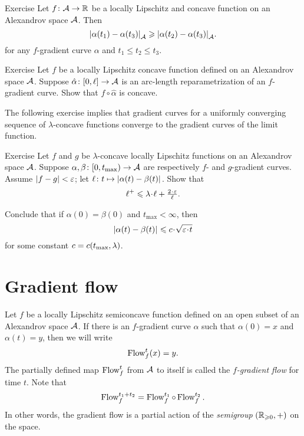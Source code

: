 \begin{thm}{Exercise}\label{ex:elf-contracting}
Let $f\colon\mathcal{A}\to\mathbb{R}$ be a locally Lipschitz and concave function on an Alexandrov space
$\mathcal{A}$.
Then 
\[|{\alpha(t_1)}-{\alpha(t_3)}|_{\mathcal{A}}^{{}}\geqslant |{\alpha(t_2)}-{\alpha(t_3)}|_{\mathcal{A}}^{{}}.\]
for any $f$-gradient curve $\alpha$ and $t_1\le t_2\le t_3$.
\end{thm}

\begin{thm}{Exercise}\label{ex:mayer}
Let $f$ be a locally Lipschitz concave function defined on an Alexandrov space $\mathcal{A}$.
Suppose $\hat\alpha\colon[0,\ell]\to\mathcal{A}$ is an arc-length reparametrization of an $f$-gradient curve.
Show that $f\circ\hat\alpha$ is concave.
\end{thm}




The following exercise implies that gradient curves for a uniformly converging sequence of $\lambda$-concave functions converge to the gradient curves of the limit function.

\begin{thm}{Exercise}\label{lem:fg-dist-est}
Let $f$ and $g$ be $\lambda$-concave locally Lipschitz functions on an Alexandrov space $\mathcal{A}$.
Suppose
$\alpha,\beta\colon[0,t_{\max})\to \mathcal{A}$ are respectively $f$- and $g$-gradient curves.
Assume $|f-g|<\varepsilon$; let $\ell\colon t\mapsto|{\alpha(t)}-{\beta(t)}|_{}^{{}}$.
Show that
\[\ell^+\le \lambda\cdot\ell+\tfrac{2\cdot\eps}{\ell}.\]

Conclude that if $\alpha(0)=\beta(0)$ and $t_{\max}<\infty$, then
\[\dist{\alpha(t)}{\beta(t)}{}
\le
\Const\cdot\sqrt{\eps\cdot t}\]
for some constant $c=c(t_{\max},\lambda)$.
\end{thm}

\section{Gradient flow}

Let $f$ be a locally Lipschitz semiconcave function defined on an open subset of an Alexandrov space $\mathcal{A}$.
If there is an $f$-gradient curve $\alpha$ such that $\alpha(0)=x$ and $\alpha(t)=y$,
then we will write 
\[\mathop{\rm Flow}\nolimits^t_f(x)=y.\]
The partially defined map $\mathop{\rm Flow}\nolimits^t_f$ from $\mathcal{A}$ to itself is called the \emph{$f$-gradient flow} for time $t$.
Note that
\[\mathop{\rm Flow}\nolimits^{t_1+t_2}_f=\mathop{\rm Flow}\nolimits_f^{t_1}\circ\mathop{\rm Flow}\nolimits_f^{t_2}.\]
In other words, the gradient flow is a partial action of the \textit{semigroup} $(\mathbb{R}_{\geqslant0},+)$ on the space.
 
